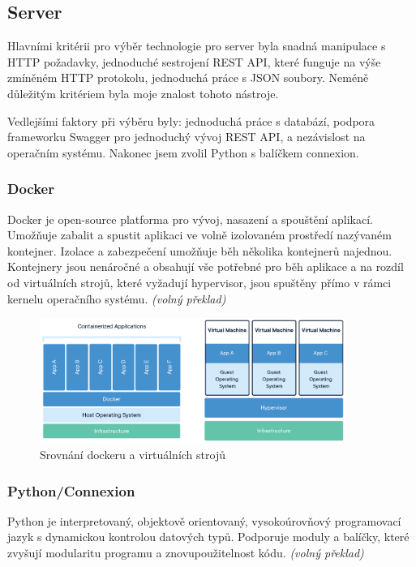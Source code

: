 \documentclass[
  glossaries,
]{kidiplom}
\begin{document}
\subsection{Server}
Hlavními kritérii pro výběr technologie pro server byla snadná manipulace s HTTP požadavky, jednoduché sestrojení REST API, které funguje na výše zmíněném HTTP protokolu, jednoduchá práce s JSON soubory. Neméně důležitým kritériem byla moje znalost tohoto nástroje.

Vedlejšími faktory při výběru byly: jednoduchá práce s databází, podpora frameworku Swagger pro jednoduchý vývoj REST API, a nezávislost na operačním systému. Nakonec jsem zvolil Python s balíčkem connexion.

\subsubsection{Docker}
Docker je open-source platforma pro vývoj, nasazení a spouštění aplikací. Umožňuje zabalit a spustit aplikaci 	ve volně izolovaném prostředí nazývaném kontejner. Izolace a zabezpečení umožňuje běh několika kontejnerů najednou. Kontejnery jsou nenáročné a obsahují vše potřebné pro běh aplikace a na rozdíl od virtuálních strojů, které vyžadují hypervisor, jsou spuštěny přímo v rámci kernelu operačního systému.\cite{DOCKER} \textit {(volný překlad)}
\begin{figure}[htp]
    \centering
    \includegraphics[width=10cm]{Docker-containerized-and-vm-transparent-bg}
    \caption{Srovnání dockeru a virtuálních strojů \cite{DOCKERIMAGE}}
    \label{fig:DockerSchema}
\end{figure}

\clearpage

\subsubsection{Python/Connexion}
Python je interpretovaný, objektově orientovaný, vysokoúrovňový programovací jazyk s dynamickou kontrolou datových typů. Podporuje moduly a balíčky, které zvyšují modularitu programu a znovupoužitelnost kódu. \cite{PYTHON} \textit {(volný překlad)}
\end{document}

